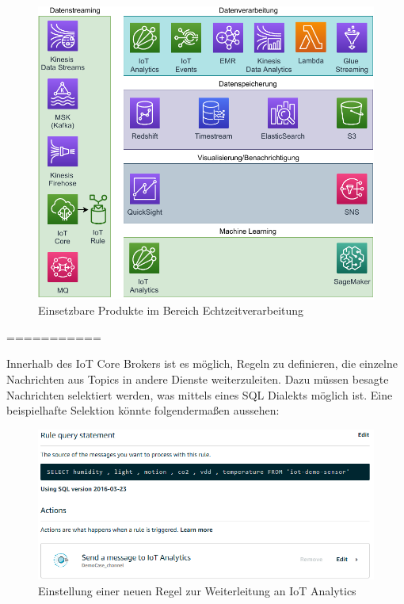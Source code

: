 \begin{figure}[H]
\centering
\includegraphics[width=\textwidth]{graphics/Overview-Realtime.pdf}
\caption{Einsetzbare Produkte im Bereich Echtzeitverarbeitung}
\label{abb:ProdukteRT}
\end{figure}


===========

Innerhalb des \ac{IoT} Core Brokers ist es möglich, Regeln zu definieren, die einzelne Nachrichten aus Topics in andere Dienste weiterzuleiten. Dazu müssen besagte Nachrichten selektiert werden, was mittels eines SQL Dialekts möglich ist. Eine beispielhafte Selektion könnte folgendermaßen aussehen: 


\begin{figure}[H]
\centering
\includegraphics[width=\textwidth]{graphics/IoT-Rules-console.png}
\caption{Einstellung einer neuen Regel zur Weiterleitung an IoT Analytics}
\label{abb:IoTRulesExample}
\end{figure}

